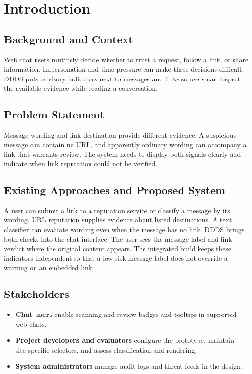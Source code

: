 \documentclass[12pt,letterpaper,twoside,openany]{book}
\makeatletter
\renewcommand{\mainmatter}{%
  \clearpage\@mainmattertrue\pagenumbering{arabic}%
}
\makeatother
\begin{document}
\tableofcontents
\listoffigures
\listoftables

\mainmatter

\chapter{Introduction}

\section{Background and Context}

Web chat users routinely decide whether to trust a request, follow a link, or share information. Impersonation and time pressure can make these decisions difficult. DDDS puts advisory indicators next to messages and links so users can inspect the available evidence while reading a conversation.

\section{Problem Statement}

Message wording and link destination provide different evidence. A suspicious message can contain no URL, and apparently ordinary wording can accompany a link that warrants review. The system needs to display both signals clearly and indicate when link reputation could not be verified.

\section{Existing Approaches and Proposed System}

A user can submit a link to a reputation service or classify a message by its wording. URL reputation supplies evidence about listed destinations. A text classifier can evaluate wording even when the message has no link. DDDS brings both checks into the chat interface. The user sees the message label and link verdict where the original content appears. The integrated build keeps these indicators independent so that a low-risk message label does not override a warning on an embedded link. \cite{proposal,integration}

\section{Stakeholders}

\begin{itemize}
  \item \textbf{Chat users} enable scanning and review badges and tooltips in supported web chats.
  \item \textbf{Project developers and evaluators} configure the prototype, maintain site-specific selectors, and assess classification and rendering.
  \item \textbf{System administrators} manage audit logs and threat feeds in the design. \cite{project}
\end{itemize}
\end{document}

